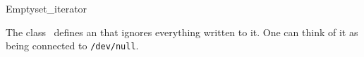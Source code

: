   
  




\begin{ccRefClass}{Emptyset_iterator}
  \label{sectionEmptysetIterator}

  
  \ccDefinition The class \ccClassName\ defines an
   that ignores everything written to it. One can
  think of it as being connected to \texttt{/dev/null}.


  \ccIsModel
  
  \ccCreation

  
  
  \ccSeeAlso

\end{ccRefClass}

